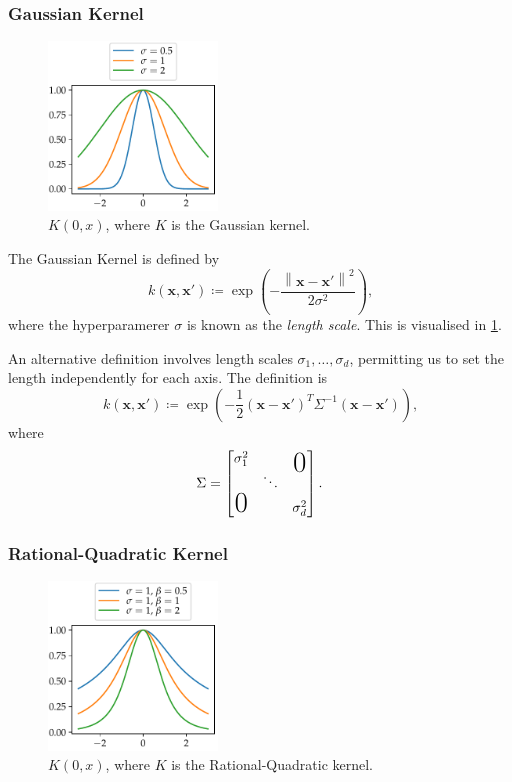 \documentclass[11pt,twoside,openright]{report}
\newcommand\bx{\mathbf{x}}
\newcommand\norm[1]{\left\|#1\right\|}
\begin{document}
\subsubsection{Gaussian Kernel}

  \begin{figure}
    \centering
    \includegraphics[width=0.4\textwidth]{gaussian_kernel_plot.pdf}
    \caption{$K(0, x)$, where $K$ is the Gaussian kernel.}
    \label{fig:gaussian_kernel}
  \end{figure}

The Gaussian Kernel is defined by \[
    k(\bx, \bx') \coloneqq \exp\left( - \frac{\norm{\bx - \bx'}^2}{2\sigma^2} \right) \text{,}
\] where the hyperparamerer $\sigma$ is known as the \textit{length scale}. This is visualised in \cref{fig:gaussian_kernel}.

An alternative definition involves length scales $\sigma_1, \dots, \sigma_d$, permitting us to set the length independently for each axis. The definition is \[
    k(\bx, \bx') \coloneqq \exp\left( - \frac{1}{2}\left(\bx - \bx'\right)^T\Sigma^{-1}\left(\bx - \bx'\right) \right) \text{,}
\] where \[
    \Sigma = \begin{bmatrix}
        \sigma_1^2 & & \makebox(0,0){\text{\huge0}} \\
        & \ddots & \\
        \mbox{\huge 0} & & \sigma_d^2
    \end{bmatrix} \text{.}
\]

\subsubsection{Rational-Quadratic Kernel}

  \begin{figure}
    \centering
    \includegraphics[width=0.4\textwidth]{rational_quadratic_kernel_plot.pdf}
    \caption{$K(0, x)$, where $K$ is the Rational-Quadratic kernel.}
    \label{fig:rational_quadratic_kernel}
  \end{figure}
\end{document}
